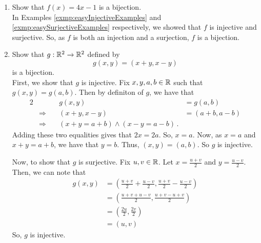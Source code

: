 \guard






\begin{exmp}
\label{exmp:easyBijectionExamples}
  \begin{enumerate}
    \item Show that $f(x) = 4x-1$ is a bijection.\\

    In Examples \ref{exmp:easyInjectiveExamples} and \ref{exmp:easySurjectiveExamples} respectively, we showed that $f$ is injective and surjective.
    So, as $f$ is both an injection and a surjection, $f$ is a bijection.

    \item Show that $g:\mathbb{R}^2\to\mathbb{R}^2$ defined by \[ g(x,y) = (x+y,x-y)\] is a bijection.\\

    First, we show that $g$ is injective.
    Fix $x,y,a,b\in\mathbb{R}$ such that $g(x,y) = g(a,b)$.
    Then by definiton of $g$, we have that
    \begin{alignat*}{2}
      && g(x,y)&=g(a,b) \\
      &\Rightarrow\quad& (x+y,x-y) &= (a+b,a-b) \\
      &\Rightarrow\quad& (x+y = a+b)\wedge (x-y=a-b)\,.
    \end{alignat*}
    Adding these two equalities gives that $ 2x = 2a$.
    So, $x=a$.
    Now, as $x=a$ and $x+y = a+b$, we have that $y=b$.
    Thus, $(x,y)=(a,b)$.
    So $g$ is injective.

    Now, to show that $g$ is surjective.
    Fix $u,v\in\mathbb{R}$.
    Let $x = \frac{u+v}{2}$ and $y=\frac{u-v}{2}$.
    Then, we can note that
    \begin{align*}
      g(x,y)  &= \left( \frac{u+v}{2}+\frac{u-v}{2}, \frac{u+v}{2}-\frac{u-v}{2} \right)\\
              &= \left( \frac{u+v+u-v}{2}, \frac{u+v-u+v}{2} \right)\\
              &= \left( \frac{2u}{2}, \frac{2v}{2} \right)\\
              &= \left( u, v \right)
    \end{align*}
    So, $g$ is injective.
  \end{enumerate}

\end{exmp}
